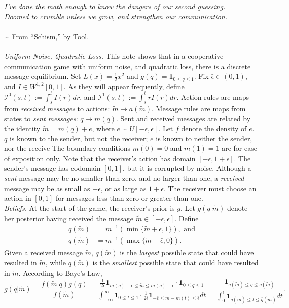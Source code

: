 \documentclass[12pt]{article}
\begin{document}
\noindent\textit{I've done the math enough to know the dangers of our second guessing.\\ Doomed to crumble unless we grow, and strengthen our communication.}\\ \\$\sim$ From ``Schism,'' by Tool. \\ \\
\noindent\textit{Uniform Noise, Quadratic Loss.} This note shows that in a cooperative communication game with uniform noise, and quadratic loss, there is a discrete message equilibrium. Set $L(x)=\frac{1}{2}x^2$ and $g(q)=\mathbf{1}_{0\leq q\leq1}$. Fix $\bar{\epsilon}\in(0,1)$, and $I\in W^{1,2}[0,1]$. As they will appear frequently, define $\mathcal{I}^{0}(s,t):=\int_{s}^{t}{I(r)dr}$, and $\mathcal{I}^{1}(s,t):=\int_{s}^{t}{rI(r)dr}$. Action rules are maps from \textit{received messages} to actions: $\tilde{m}\mapsto a(\tilde{m})$. Message rules are maps from states to \textit{sent messages}: $q\mapsto m(q)$. Sent and received messages are related by the identity $\tilde{m}=m(q)+e$, where $e\sim U[-\bar{\epsilon},\bar{\epsilon}]$. Let $f$ denote the density of $e$. $q$ is known to the sender, but not the receiver; $e$ is known to neither the sender, nor the receive
The boundary conditions $m(0)=0$ and $m(1)=1$ are for ease of exposition only. Note that the receiver's action has domain $[-\bar{\epsilon},1+\bar{\epsilon}]$. The sender's message has codomain $[0,1]$, but it is corrupted by noise. Although a \textit{sent} message may be no smaller than zero, and no larger than one, a \textit{received} message may be as small as $-\bar{\epsilon}$, or as large as $1+\bar{\epsilon}$. The receiver must choose an action in $[0,1]$ for messages less than zero or greater than one.\\

\noindent\textit{Beliefs.} At the start of the game, the receiver's prior is $g$. Let $g(q|\tilde{m})$ denote her posterior having received the message $\tilde{m}\in[-\bar{\epsilon},\bar{\epsilon}]$. Define 
\begin{align}
\overline{q}(\tilde{m})&=m^{-1}(\min\{\tilde{m}+\bar{\epsilon},1\}),\text{ and}\\
\underline{q}(\tilde{m})&=m^{-1}(\max\{\tilde{m}-\bar{\epsilon},0\}).
\end{align} 
Given a received message $\tilde{m}$, $\overline{q}(\tilde{m})$ is the \textit{largest} possible state that could have resulted in $\tilde{m}$, while $\underline{q}(\tilde{m})$ is the \textit{smallest} possible state that could have resulted in $\tilde{m}$. According to Baye's Law,
\begin{equation}
g(q|\tilde{m})=\frac{f(\tilde{m}|q)g(q)}{f(\tilde{m})}=\frac{\frac{1}{2\bar{\epsilon}}\mathbf{1}_{m(q)-\bar{\epsilon}\leq \tilde{m}\leq m(q)+\bar{\epsilon}}\cdot\mathbf{1}_{0\leq q\leq 1}}{\int_{-\infty}^{\infty}{\mathbf{1}_{0\leq t\leq1}\cdot\frac{1}{2\bar{\epsilon}}\mathbf{1}_{-\bar{\epsilon}\leq \tilde{m}-m(t)\leq\bar{\epsilon}}dt}}=\frac{\mathbf{1}_{\underline{q}(\tilde{m})\leq q\leq\overline{q}(\tilde{m})}}{\int_{0}^{1}{\mathbf{1}_{\underline{q}(\tilde{m})\leq t\leq\overline{q}(\tilde{m})}dt}}.
\end{equation}
\end{document}
